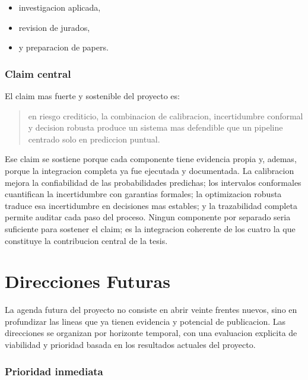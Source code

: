 \documentclass[
  spanish,
  11pt,
  letterpaper,
]{scrbook}
\providecommand{\tightlist}{%
  \setlength{\itemsep}{0pt}\setlength{\parskip}{0pt}}
\theoremstyle{plain}
\theoremstyle{remark}
\begin{document}
\begin{itemize}
\tightlist
\item
  investigacion aplicada,
\item
  revision de jurados,
\item
  y preparacion de papers.
\end{itemize}

\subsection{Claim central}\label{claim-central}

El claim mas fuerte y sostenible del proyecto es:

\begin{quote}
en riesgo crediticio, la combinacion de calibracion, incertidumbre
conformal y decision robusta produce un sistema mas defendible que un
pipeline centrado solo en prediccion puntual.
\end{quote}

Ese claim se sostiene porque cada componente tiene evidencia propia y,
ademas, porque la integracion completa ya fue ejecutada y documentada.
La calibracion mejora la confiabilidad de las probabilidades predichas;
los intervalos conformales cuantifican la incertidumbre con garantias
formales; la optimizacion robusta traduce esa incertidumbre en
decisiones mas estables; y la trazabilidad completa permite auditar cada
paso del proceso. Ningun componente por separado seria suficiente para
sostener el claim; es la integracion coherente de los cuatro la que
constituye la contribucion central de la tesis.

\chapter{Direcciones Futuras}\label{sec-future-directions}

La agenda futura del proyecto no consiste en abrir veinte frentes
nuevos, sino en profundizar las lineas que ya tienen evidencia y
potencial de publicacion. Las direcciones se organizan por horizonte
temporal, con una evaluacion explicita de viabilidad y prioridad basada
en los resultados actuales del proyecto.

\subsection{Prioridad inmediata}\label{prioridad-inmediata}
\end{document}

